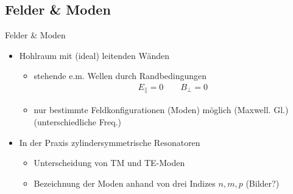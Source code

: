 \documentclass[12pt,xcolor=dvipsnames,professionalfonts]{beamer}
\begin{document}
\subsection{Felder \& Moden}
\begin{frame}{Felder \& Moden}
	\begin{itemize}
		\item Hohlraum mit (ideal) leitenden Wänden
		
		\begin{itemize}
			\item stehende e.m. Wellen durch Randbedingungen
			\begin{align*}
				E_\parallel = 0 \qquad B_\perp = 0
			\end{align*}
			\item nur bestimmte Feldkonfigurationen (Moden) möglich (Maxwell. Gl.) (unterschiedliche Freq.)
		\end{itemize}
		
		\item In der Praxis zylindersymmetrische Resonatoren
		\begin{itemize}
			\item Unterscheidung von TM und TE-Moden
			\item Bezeichnung der Moden anhand von drei Indizes $n, m, p$ (Bilder?)
		\end{itemize}
		
	\end{itemize}
\end{frame}
\end{document}
